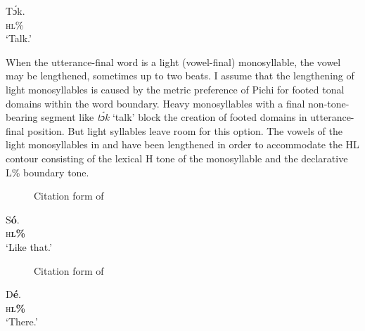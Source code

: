 \ea\label{ex:key:44}
\gll Tɔ́k.\\
\textsc{hl\%}\\
\glt ‘Talk.’
\z

\largerpage
When the utterance-final word is a light (vowel-final) monosyllable, the vowel may be lengthened, sometimes up to two beats. I assume that the lengthening of light monosyllables is caused by the metric preference of Pichi for footed tonal domains within the word boundary. Heavy monosyllables with a final non-tone-bearing segment like \textit{tɔ́k} ‘talk’ block the creation of footed domains in utterance-final position. But light syllables leave room for this option. The vowels of the light monosyllables in  and  have been lengthened in order to accommodate the HL contour consisting of the lexical H tone of the monosyllable and the declarative L\% boundary tone. 

\largerpage[2]

\begin{figure} 
\caption{Citation form of }
\label{fig:key:3.3}
\end{figure}


   
\ea\label{ex:key:45}
\gll      S\textbf{ó}.\\
\textsc{h}\textbf{\textsc{l\%}}\\
\glt ‘Like that.’
\zlast

\begin{figure}
\caption{Citation form of }
\label{fig:key:3.4} 
\end{figure} 

\clearpage 

\ea\label{ex:key:46}
\gll    D\textbf{é}.\\
\textsc{h}\textbf{\textsc{l\%}}\\
\glt ‘There.’
\z


